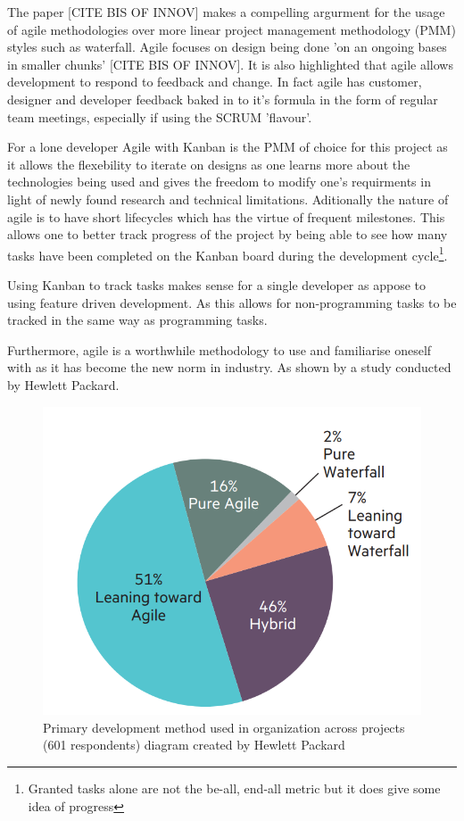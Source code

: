 The paper [CITE BIS OF INNOV] makes a compelling argurment for the usage of agile methodologies over more linear project management methodology (PMM) styles such as waterfall. Agile focuses on design being done 'on an ongoing bases in smaller chunks' [CITE BIS OF INNOV]. It is also highlighted that agile allows development to respond to feedback and change. In fact agile has customer, designer and developer feedback baked in to it's formula in the form of regular team meetings, especially if using the SCRUM 'flavour'.
\par
For a lone developer Agile with Kanban is the PMM of choice for this project as it allows the flexebility to iterate on designs as one learns more about the technologies being used and gives the freedom to modify one's requirments in light of newly found research and technical limitations. Aditionally the nature of agile is to have short lifecycles which has the virtue of frequent milestones. This allows one to better track progress of the project by being able to see how many tasks have been completed on the Kanban board during the development cycle\footnote[4]{Granted tasks alone are not the be-all, end-all metric but it does give some idea of progress}.
\par
Using Kanban to track tasks makes sense for a single developer as appose to using feature driven development. As this allows for non-programming tasks to be tracked in the same way as programming tasks.
\par
Furthermore, agile is a worthwhile methodology to use and familiarise oneself with as it has become the new norm in industry. As shown by a study conducted by Hewlett Packard.

\begin{figure}[H]
  \begin{center}
    \includegraphics[scale=0.4]{Images/PMMPieChart}
    \caption{Primary development method used in organization across projects (601 respondents) diagram created by Hewlett Packard}
    \label{fig:PMM_PieChart}
  \end{center}
\end{figure}

